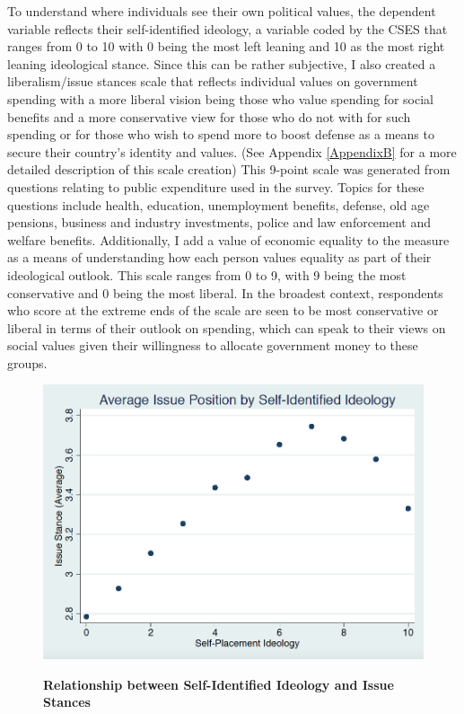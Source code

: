 \documentclass[12pt, titlepage]{article}
\newcommand\tb{\textbf}
\begin{document}
To understand where individuals see their own political values, the dependent variable reflects their self-identified ideology, a variable coded by the CSES that ranges from 0 to 10 with 0 being the most left leaning and 10 as the most right leaning ideological stance. Since this can be rather subjective, I also created a liberalism/issue stances scale that reflects individual values on government spending with a more liberal vision being those who value spending for social benefits and a more conservative view for those who do not with for such spending or for those who wish to spend more to boost defense as a means to secure their country's identity and values. (See Appendix \ref{AppendixB} for a more detailed description of this scale creation) This 9-point scale was generated from questions relating to public expenditure used in the survey. Topics for these questions include health, education, unemployment benefits, defense, old age pensions, business and industry investments, police and law enforcement and welfare benefits. Additionally, I add a value of economic equality to the measure as a means of understanding how each person values equality as part of their ideological outlook. This scale ranges from 0 to 9, with 9 being the most conservative and 0 being the most liberal. In the broadest context, respondents who score at the extreme ends of the scale are seen to be most conservative or liberal in terms of their outlook on spending, which can speak to their views on social values given their willingness to allocate government money to these groups.

\begin{figure}[ht!]    \centering
	{	 \includegraphics[width=\textwidth]{AvgLibPF}}
	\caption{\tb{Relationship between Self-Identified Ideology and Issue Stances}}\label{AvgLib}
\end{figure}
\end{document}
